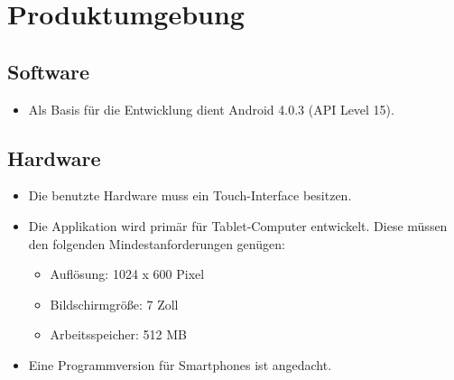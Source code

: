 \section{Produktumgebung}

\subsection{Software}
\begin{itemize}
	\item Als Basis für die Entwicklung dient Android 4.0.3 (API Level 15).
\end{itemize}
\subsection{Hardware}
\begin{itemize}
	\item Die benutzte Hardware muss ein Touch-Interface besitzen.
	\item Die Applikation wird primär für Tablet-Computer entwickelt. Diese müssen den folgenden Mindestanforderungen genügen:
	\begin{itemize}
		\item Auflösung: 1024 x 600 Pixel
		\item Bildschirmgröße: 7 Zoll
		\item Arbeitsspeicher: 512 MB
	\end{itemize}
	\item Eine Programmversion für Smartphones ist angedacht.
\end{itemize}
